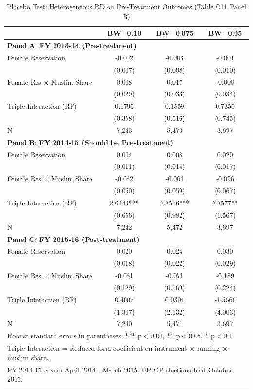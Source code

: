 \begin{table}[htbp]
\centering
\caption{Placebo Test: Heterogeneous RD on Pre-Treatment Outcomes (Table C11 Panel B)}
\label{tab:placebo_het}
\small
\begin{tabular}{lccc}
\hline\hline
 & BW=0.10 & BW=0.075 & BW=0.05 \\
\hline
\multicolumn{4}{l}{\textbf{Panel A: FY 2013-14 (Pre-treatment)}} \\
Female Reservation & -0.002 & -0.003 & -0.001 \\
 & (0.007) & (0.008) & (0.010) \\
Female Res $\times$ Muslim Share & 0.008 & 0.017 & -0.008 \\
 & (0.029) & (0.033) & (0.034) \\
Triple Interaction (RF) & 0.1795 & 0.1559 & 0.7355 \\
 & (0.358) & (0.516) & (0.745) \\
N & 7,243 & 5,473 & 3,697 \\
\hline
\multicolumn{4}{l}{\textbf{Panel B: FY 2014-15 (Should be Pre-treatment)}} \\
Female Reservation & 0.004 & 0.008 & 0.020 \\
 & (0.011) & (0.014) & (0.017) \\
Female Res $\times$ Muslim Share & -0.062 & -0.064 & -0.096 \\
 & (0.050) & (0.059) & (0.067) \\
Triple Interaction (RF) & 2.6449*** & 3.3516*** & 3.3577** \\
 & (0.656) & (0.982) & (1.567) \\
N & 7,242 & 5,472 & 3,697 \\
\hline
\multicolumn{4}{l}{\textbf{Panel C: FY 2015-16 (Post-treatment)}} \\
Female Reservation & 0.020 & 0.024 & 0.030 \\
 & (0.018) & (0.022) & (0.029) \\
Female Res $\times$ Muslim Share & -0.061 & -0.071 & -0.189 \\
 & (0.129) & (0.169) & (0.224) \\
Triple Interaction (RF) & 0.4007 & 0.0304 & -1.5666 \\
 & (1.307) & (2.132) & (4.003) \\
N & 7,240 & 5,471 & 3,697 \\
\hline\hline
\multicolumn{4}{l}{\footnotesize Robust standard errors in parentheses. *** p$<$0.01, ** p$<$0.05, * p$<$0.1} \\
\multicolumn{4}{l}{\footnotesize Triple Interaction = Reduced-form coefficient on instrument $\times$ running $\times$ muslim share.} \\
\multicolumn{4}{l}{\footnotesize FY 2014-15 covers April 2014 - March 2015. UP GP elections held October 2015.} \\
\end{tabular}
\end{table}
